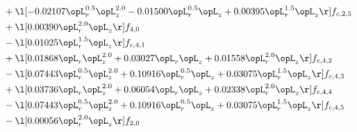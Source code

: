 \begin{alignat}{2}
& + \l[  -0.02107 \opL_r^{0.5} \opL_z^{2.0}   -0.01500 \opL_r^{0.5} \opL_z +  0.00395 \opL_r^{1.5} \opL_z  \r] f_{c,2,5} \nonumber \\ 
& + \l[  0.00390 \opL_r^{2.0} \opL_z  \r] f_{4,0} \nonumber \\ 
& - \l[  0.01025 \opL_r^{1.5} \opL_z  \r] f_{c,4,1} \nonumber \\ 
& + \l[  0.01868 \opL_r \opL_z^{2.0} +  0.03027 \opL_r \opL_z +  0.01558 \opL_r^{2.0} \opL_z  \r] f_{c,4,2} \nonumber \\ 
& - \l[  0.07443 \opL_r^{0.5} \opL_z^{2.0} +  0.10916 \opL_r^{0.5} \opL_z +  0.03075 \opL_r^{1.5} \opL_z  \r] f_{c,4,3} \nonumber \\ 
& + \l[  0.03736 \opL_r \opL_z^{2.0} +  0.06054 \opL_r \opL_z +  0.02338 \opL_r^{2.0} \opL_z  \r] f_{c,4,4} \nonumber \\ 
& - \l[  0.07443 \opL_r^{0.5} \opL_z^{2.0} +  0.10916 \opL_r^{0.5} \opL_z +  0.03075 \opL_r^{1.5} \opL_z  \r] f_{c,4,5} \nonumber \\ 
& - \l[  0.00056 \opL_r^{2.0} \opL_z  \r] f_{2,0} \nonumber \\ 
\end{alignat} 



